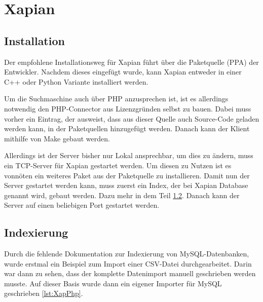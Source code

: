 
\section{Xapian}

\subsection{Installation}

Der empfohlene Installationsweg für Xapian führt über die Paketquelle (PPA) der Entwickler. Nachdem dieses eingefügt wurde, kann Xapian entweder in einer C++ oder Python Variante installiert werden. 

Um die Suchmaschine auch über PHP anzusprechen ist, ist es allerdings notwendig den PHP-Connector aus Lizenzgründen selbst zu bauen. Dabei muss vorher ein Eintrag, der ausweist, dass aus dieser Quelle auch Source-Code geladen werden kann, in der Paketquellen hinzugefügt werden. Danach kann der Klient mithilfe von Make gebaut werden.

Allerdings ist der Server bisher nur Lokal ansprechbar, um dies zu ändern, muss ein TCP-Server für Xapian gestartet werden. Um diesen zu Nutzen ist es vonnöten ein weiteres Paket aus der Paketquelle zu installieren. Damit nun der Server gestartet werden kann, muss zuerst ein Index, der bei Xapian Database genannt wird, gebaut werden. Dazu mehr in dem Teil \ref{xap:index}. Danach kann der Server auf einen beliebigen Port gestartet werden.

\subsection{Indexierung}
\label{xap:index}

Durch die fehlende Dokumentation zur Indexierung von MySQL-Datenbanken, wurde erstmal ein Beispiel zum Import einer CSV-Datei durchgearbeitet. Darin war dann zu sehen, dass der komplette Datenimport manuell geschrieben werden musste. Auf dieser Basis wurde dann ein eigener Importer für MySQL geschrieben \ref{lst:XapPhp}.

